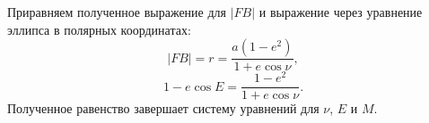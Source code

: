 Приравняем полученное выражение для $|FB|$ и выражение через уравнение эллипса в полярных координатах:
\begin{equation*}
	|FB| = r = \frac{a \left(1 - e^2 \right)}{ 1 + e \cos \nu},
\end{equation*}
\begin{equation*}
	1 - e \cos E  = \frac{1 - e^2}{ 1 + e \cos \nu}.
\end{equation*}
Полученное равенство завершает систему уравнений для $\nu$, $E$ и $M$.

